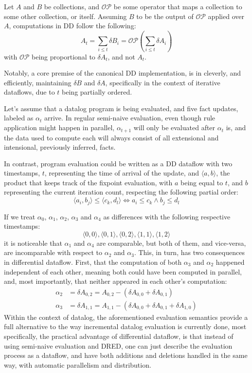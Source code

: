 \documentclass[sigconf,screen,review,natbib]{acmart}
\theoremstyle{definition}
\begin{document}
Let $A$ and $B$ be collections, and $\mathcal{OP}$ be some operator that maps a collection to some other
collection, or itself. Assuming $B$ to be the output of $\mathcal{OP}$ applied over $A$, computations in
DD follow the following: \[A_t = \sum_{i \leq t} \delta B_i = \mathcal{OP}(\sum_{i \leq t} \delta A_i)\]
with $\mathcal{OP}$ being proportional to $\delta A_t$, and not $A_t$.

Notably, a core premise of the canonical DD implementation, is in cleverly, and efficiently,
maintaining $\delta B$ and $\delta A$, specifically in the context of iterative dataflows, due to $t$ being
partially ordered.

Let's assume that a datalog program is being evaluated, and five fact updates, labeled as $\alpha_t$ arrive. In
regular semi-naive evaluation, even though rule application might happen in parallel, $\alpha_{t + 1}$ will only be
evaluated after $\alpha_{t}$ is, and the data used to compute each will always consist of all extensional and
intensional, previously inferred, facts.

In contrast, program evaluation could be written as a DD dataflow with two timestamps, $t$,
representing the time of arrival of the update, and $\langle a, b \rangle$, the product that keeps track of the
fixpoint evaluation, with $a$ being equal to $t$, and $b$ representing the current iteration count, respecting
the following partial order: \[\langle a_i, b_j \rangle \leq \langle c_k, d_l \rangle \iff a_i \leq c_k \wedge b_j \leq d_l\]

If we treat $\alpha_0$, $\alpha_1$, $\alpha_2$, $\alpha_3$ and $\alpha_4$ as differences with the following
respective timestamps: \[\langle 0, 0 \rangle, \langle 0, 1 \rangle, \langle 0, 2 \rangle, \langle 1, 1 \rangle, \langle 1, 2 \rangle\]
it is noticeable that $\alpha_1$ and $\alpha_4$ are comparable, but both of them, and vice-versa, are
incomparable with respect to $\alpha_2$ and $\alpha_3$. This, in turn, has two consequences in differential
dataflow. First, that the computation of both $\alpha_3$ and $\alpha_2$ happened independent of each other,
meaning both could have been computed in parallel, and, most importantly, that neither appeared in each other's
computation:
\begin{align*}
	\alpha_2 & = \delta A_{0, 2} = A_{0, 2} - (\delta A_{0, 0} + \delta A_{0, 1} )                  \\
	\alpha_3 & = \delta A_{1, 1} = A_{1, 1} - (\delta A_{0, 0} + \delta A_{0, 1} + \delta A_{1, 0})
\end{align*}
Within the context of datalog, the aforementioned evaluation semantics provide a full alternative to the way
incremental datalog evaluation is currently done, most specifically, the practical advantage of differential
dataflow, is that instead of using semi-naive evaluation and DRED, one can just describe the evaluation process
as a dataflow, and have both additions and deletions handled in the same way, with automatic parallelism and
distribution.
\end{document}
